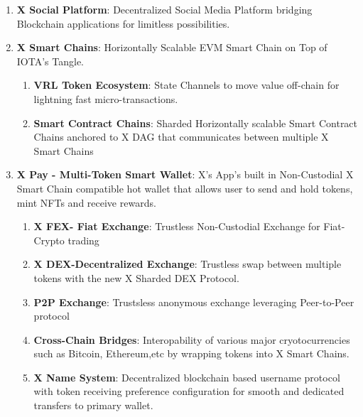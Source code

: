 \documentclass[letterpaper,11pt]{article}
\begin{document}
\begin{enumerate}[wide, labelwidth=!, labelindent=0pt]

\item \textbf{X Social Platform}: Decentralized Social Media Platform bridging Blockchain applications for limitless possibilities.

\item \textbf{X Smart Chains}: Horizontally Scalable EVM Smart Chain on Top of IOTA's Tangle.

\begin{enumerate}[wide, labelwidth=!, labelindent=0pt]

	\item \textbf{VRL Token Ecosystem}: State Channels to move value off-chain for lightning fast micro-transactions.

	\item \textbf{Smart Contract Chains}: Sharded Horizontally scalable Smart Contract Chains anchored to X DAG that communicates between multiple X Smart Chains

\end{enumerate}

\item \textbf{X Pay - Multi-Token Smart Wallet}: X's App's built in Non-Custodial X Smart Chain compatible hot wallet that allows user to send and hold tokens, mint NFTs and receive rewards.

\begin{enumerate}[wide, labelwidth=!, labelindent=0pt]

\item \textbf{X FEX- Fiat Exchange}: Trustless Non-Custodial Exchange for Fiat-Crypto trading
\item \textbf{X DEX-Decentralized Exchange}: Trustless swap between multiple tokens with the new X Sharded DEX Protocol.

\item \textbf{P2P Exchange}: Trustsless anonymous exchange leveraging Peer-to-Peer protocol

\item \textbf{Cross-Chain Bridges}: Interopability of various major cryotocurrencies such as Bitcoin, Ethereum,etc by wrapping tokens into X Smart Chains.

\item \textbf{X Name System}: Decentralized blockchain based username protocol with token receiving preference configuration for smooth and dedicated transfers to primary wallet.


\end{enumerate}
\end{enumerate}
\end{document}
